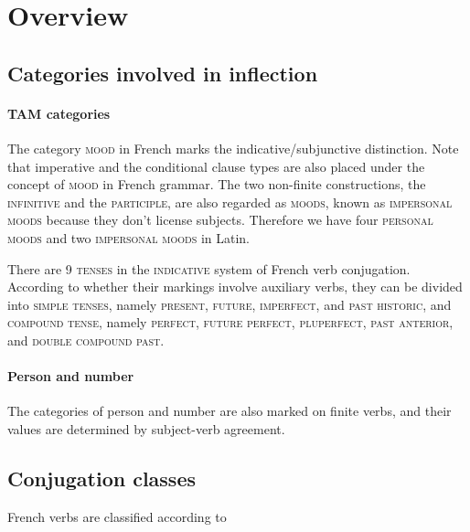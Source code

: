 \documentclass[a4paper, oneside, 12pt]{report}
\newcommand*{\category}[1]{\textsc{#1}}
\begin{document}
\section{Overview}

\subsection{Categories involved in inflection}\label{sec:verb-inflection.overview.categories}

\paragraph*{TAM categories}
The category \category{mood} in French marks the indicative/subjunctive distinction.
Note that imperative and the conditional clause types
are also placed under the concept of \category{mood} in French grammar.
The two non-finite constructions, the \category{infinitive} and the \category{participle},
are also regarded as \category{moods},
known as \category{impersonal moods} because they don't license subjects.
Therefore we have four \category{personal moods} and two \category{impersonal moods} in Latin.

There are 9 \category{tenses} in the \category{indicative} system of French verb conjugation.
According to whether their markings involve auxiliary verbs,
they can be divided into \category{simple tenses}, namely \category{present}, \category{future}, \category{imperfect}, and \category{past historic},
and \category{compound tense}, namely \category{perfect}, \category{future perfect}, \category{pluperfect}, \category{past anterior}, and \category{double compound past}.

\paragraph*{Person and number}
The categories of person and number are also marked on finite verbs,
and their values are determined by subject-verb agreement. 

\subsection{Conjugation classes}

French verbs are classified according to 



\end{document}
